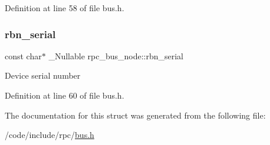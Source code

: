 Definition at line 58 of file bus.\+h.

\mbox{\label{structrpc__bus__node_a885b358a61a0b459d86d7c534be6ef0f}} 
\subsubsection{\texorpdfstring{rbn\+\_\+serial}{rbn\_serial}}
{\footnotesize\ttfamily const char$\ast$ \+\_\+\+Nullable rpc\+\_\+bus\+\_\+node\+::rbn\+\_\+serial}

Device serial number 

Definition at line 60 of file bus.\+h.



The documentation for this struct was generated from the following file\+:\begin{DoxyCompactItemize}
\item 
/code/include/rpc/\hyperlink{bus_8h}{bus.\+h}\end{DoxyCompactItemize}
